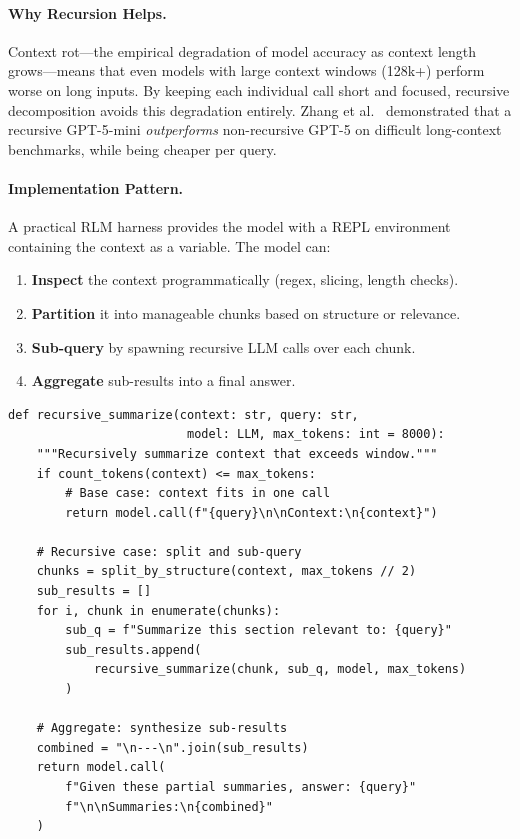 \paragraph{Why Recursion Helps.}
\label{why-recursion-helps.}

Context rot---the empirical degradation of model accuracy as context length grows---means that even models with large context windows (128k+) perform worse on long inputs. By keeping each individual call short and focused, recursive decomposition avoids this degradation entirely. Zhang et al.~\cite{zhang2025rlm} demonstrated that a recursive GPT-5-mini \emph{outperforms} non-recursive GPT-5 on difficult long-context benchmarks, while being cheaper per query.

\paragraph{Implementation Pattern.}
\label{implementation-pattern.}

A practical RLM harness provides the model with a REPL environment containing the context as a variable. The model can:

\begin{enumerate}
  \item \textbf{Inspect} the context programmatically (regex, slicing, length checks).
  \item \textbf{Partition} it into manageable chunks based on structure or relevance.
  \item \textbf{Sub-query} by spawning recursive LLM calls over each chunk.
  \item \textbf{Aggregate} sub-results into a final answer.
\end{enumerate}

\begin{examplebox}
\begin{lstlisting}[style=pythonstyle]
def recursive_summarize(context: str, query: str,
                         model: LLM, max_tokens: int = 8000):
    """Recursively summarize context that exceeds window."""
    if count_tokens(context) <= max_tokens:
        # Base case: context fits in one call
        return model.call(f"{query}\n\nContext:\n{context}")

    # Recursive case: split and sub-query
    chunks = split_by_structure(context, max_tokens // 2)
    sub_results = []
    for i, chunk in enumerate(chunks):
        sub_q = f"Summarize this section relevant to: {query}"
        sub_results.append(
            recursive_summarize(chunk, sub_q, model, max_tokens)
        )

    # Aggregate: synthesize sub-results
    combined = "\n---\n".join(sub_results)
    return model.call(
        f"Given these partial summaries, answer: {query}"
        f"\n\nSummaries:\n{combined}"
    )
\end{lstlisting}
\end{examplebox}

